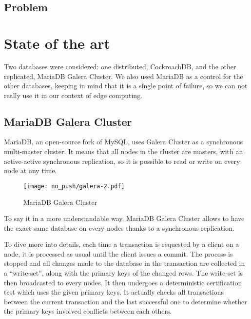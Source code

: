 \documentclass[a4paper, 10pt, titlepage]{report}
\begin{document}
\subsection{Problem}


\section{State of the art}

Two databases were considered: one distributed, CockroachDB, and the other replicated, MariaDB Galera Cluster. We also used MariaDB as a control for the other databases, keeping in mind that it is a single point of failure, so we can not really use it in our context of edge computing.

\subsection{MariaDB Galera Cluster}

MariaDB, an open-source fork of MySQL, uses Galera Cluster as a synchronous multi-master cluster. It means that all nodes in the cluster are masters, with an active-active synchronous replication, so it is possible to read or write on every node at any time.

\begin{figure}[H]
  \vspace{-10pt}
  \centering
  \centerline{\texttt{[image: no\_push/galera-2.pdf]}}
  \vspace{-5pt}
  \caption{MariaDB Galera Cluster}
  \vspace{-5pt}
  \label{fig:MGC}
\end{figure}

To say it in a more understandable way, MariaDB Galera Cluster allows to have the exact same database on every nodes thanks to a synchronous replication.

To dive more into details, each time a transaction is requested by a client on a node, it is processed as usual until the client issues a commit. The process is stopped and all changes made to the database in the transaction are collected in a ``write-set'', along with the primary keys of the changed rows. The write-set is then broadcasted to every nodes. It then undergoes a deterministic certification test which uses the given primary keys. It actually checks all transactions between the current transaction and the last successful one to determine whether the primary keys involved conflicts between each others.
\end{document}

